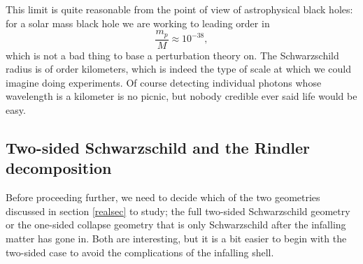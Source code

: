 \documentclass[12pt]{article}
\newcommand{\be}{\begin{equation}}
\newcommand{\ee}{\end{equation}}
\begin{document}
This limit is quite reasonable from the point of view of astrophysical black holes: for a solar mass black hole we are working to leading order in
\be
\frac{m_p}{M}\approx 10^{-38},
\ee 
which is not a bad thing to base a perturbation theory on.  The Schwarzschild radius is of order kilometers, which is indeed the type of scale at which we could imagine doing experiments.  Of course detecting individual photons whose wavelength is a kilometer is no picnic, but nobody credible ever said life would be easy.

\subsection{Two-sided Schwarzschild and the Rindler decomposition}\label{2siderindsec}
Before proceeding further, we need to decide which of the two geometries discussed in section \ref{realsec} to study; the full two-sided Schwarzschild geometry or the one-sided collapse geometry that is only Schwarzschild after the infalling matter has gone in.  Both are interesting, but it is a bit easier to begin with the two-sided case to avoid the complications of the infalling shell.  
\end{document}
